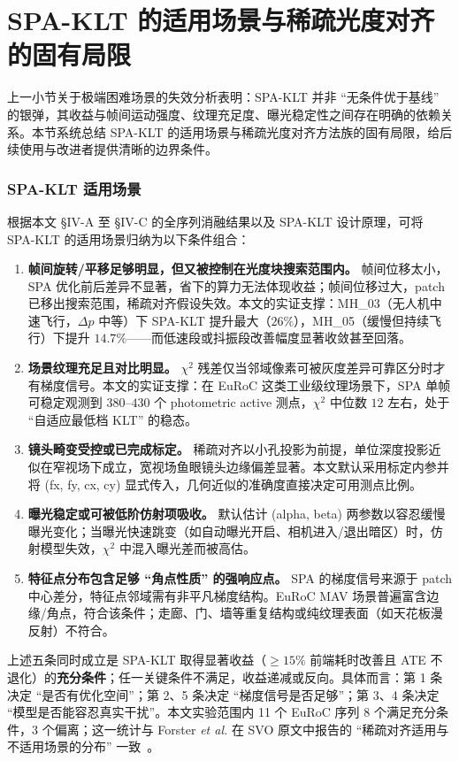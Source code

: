 \documentclass[letterpaper,journal]{IEEEtran}
\begin{document}
\section{SPA-KLT 的适用场景与稀疏光度对齐的固有局限}
\label{sec:limitations}

上一小节关于极端困难场景的失效分析表明：SPA-KLT 并非 ``无条件优于基线'' 的银弹，其收益与帧间运动强度、纹理充足度、曝光稳定性之间存在明确的依赖关系。本节系统总结 SPA-KLT 的适用场景与稀疏光度对齐方法族的固有局限，给后续使用与改进者提供清晰的边界条件。

\subsubsection{SPA-KLT 适用场景}

根据本文 §IV-A 至 §IV-C 的全序列消融结果以及 SPA-KLT 设计原理，可将 SPA-KLT 的适用场景归纳为以下条件组合：

\begin{enumerate}
\item \textbf{帧间旋转/平移足够明显，但又被控制在光度块搜索范围内。} 帧间位移太小，SPA 优化前后差异不显著，省下的算力无法体现收益；帧间位移过大，patch 已移出搜索范围，稀疏对齐假设失效。本文的实证支撑：MH\_03（无人机中速飞行，$\Delta p$ 中等）下 SPA-KLT 提升最大（$26\%$），MH\_05（缓慢但持续飞行）下提升 $14.7\%$——而低速段或抖振段改善幅度显著收敛甚至回落。
\item \textbf{场景纹理充足且对比明显。} $\chi^2$ 残差仅当邻域像素可被灰度差异可靠区分时才有梯度信号。本文的实证支撑：在 EuRoC 这类工业级纹理场景下，SPA 单帧可稳定观测到 $380$--$430$ 个 photometric active 测点，$\chi^2$ 中位数 $12$ 左右，处于 ``自适应最低档 KLT'' 的稳态。
\item \textbf{镜头畸变受控或已完成标定。} 稀疏对齐以小孔投影为前提，单位深度投影近似在窄视场下成立，宽视场鱼眼镜头边缘偏差显著。本文默认采用标定内参并将 (fx, fy, cx, cy) 显式传入，几何近似的准确度直接决定可用测点比例。
\item \textbf{曝光稳定或可被低阶仿射项吸收。} 默认估计 (alpha, beta) 两参数以容忍缓慢曝光变化；当曝光快速跳变（如自动曝光开启、相机进入/退出暗区）时，仿射模型失效，$\chi^2$ 中混入曝光差而被高估。
\item \textbf{特征点分布包含足够 ``角点性质'' 的强响应点。} SPA 的梯度信号来源于 patch 中心差分，特征点邻域需有非平凡梯度结构。EuRoC MAV 场景普遍富含边缘/角点，符合该条件；走廊、门、墙等重复结构或纯纹理表面（如天花板漫反射）不符合。
\end{enumerate}

上述五条同时成立是 SPA-KLT 取得显著收益（$\ge 15\%$ 前端耗时改善且 ATE 不退化）的\textbf{充分条件}；任一关键条件不满足，收益递减或反向。具体而言：第 1 条决定 ``是否有优化空间''；第 2、5 条决定 ``梯度信号是否足够''；第 3、4 条决定 ``模型是否能容忍真实干扰''。本文实验范围内 11 个 EuRoC 序列 8 个满足充分条件，3 个偏离；这一统计与 Forster \textit{et al.} 在 SVO 原文中报告的 ``稀疏对齐适用与不适用场景的分布'' 一致~\cite{forster2017svo}。
\end{document}
